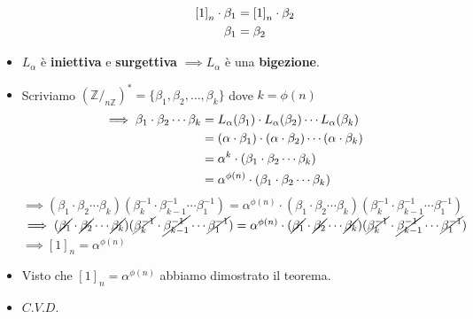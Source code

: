 \documentclass[10pt]{article}
\begin{document}
\begin{itemize}
\begin{itemize}
\begin{equation}
\begin{split}
\left[1\right]_n \cdot \beta_1 &= \left[1\right]_n \cdot \beta_2 \\
\beta_1 &= \beta_2
\notag
\end{split}
\end{equation}
\end{itemize}
\item
$L_\alpha$ è \textbf{iniettiva} e \textbf{surgettiva} $\implies L_\alpha$ è una \textbf{bigezione}.
\item
Scriviamo $\left(\mathbb{Z}/_{n \mathbb{Z}}\right)^{*} = \{\beta_1, \beta_2, \dotso, \beta_k \}$ dove $k = \phi(n)$
\begin{equation}
\begin{split}
\implies \beta_1 \cdot \beta_2\dotsb \beta_k &= L_\alpha(\beta_1) \cdot L_\alpha(\beta_2) \dotsb L_\alpha(\beta_k) \\
&= (\alpha \cdot \beta_1)\cdot(\alpha \cdot \beta_2)\dotsb(\alpha \cdot \beta_k) \\
&= \alpha^k \cdot (\beta_1 \cdot \beta_2 \dotsb \beta_k) \\
&= \alpha^{\phi(n)} \cdot (\beta_1 \cdot \beta_2 \dotsb \beta_k) \notag
\end{split}
\end{equation}
$\!\!\implies (\beta_1 \cdot \beta_2 \dotsb \beta_k) (\beta^{-1}_k \cdot \beta^{-1}_{k-1} \dotsb \beta^{-1}_1) = \alpha^{\phi(n)} \cdot (\beta_1 \cdot \beta_2 \dotsb \beta_k) (\beta^{-1}_k \cdot \beta^{-1}_{k-1} \dotsb \beta^{-1}_1)$\\
$\implies (\cancel{\beta_1} \cdot \cancel{\beta_2} \dotsb \cancel{\beta_k}) (\cancel{\beta^{-1}_k} \cdot \cancel{\beta^{-1}_{k-1}} \dotsb \cancel{\beta^{-1}_1}) = \alpha^{\phi(n)} \cdot (\cancel{\beta_1} \cdot \cancel{\beta_2} \dotsb \cancel{\beta_k}) (\cancel{\beta^{-1}_k} \cdot \cancel{\beta^{-1}_{k-1}} \dotsb \cancel{\beta^{-1}_1})$\\
$\implies \left[1\right]_{n} = \alpha^{\phi(n)}$
\item
Visto che $\left[1\right]_{n} = \alpha^{\phi(n)}$ abbiamo dimostrato il teorema.
\item
$C.V.D.$
\end{itemize}
\end{document}
